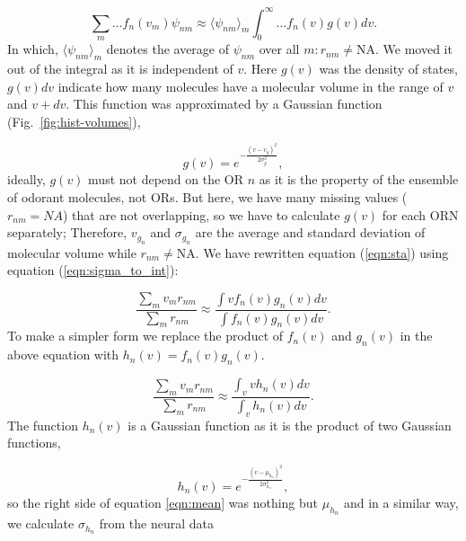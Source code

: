 \documentclass[fleqn,11pt]{wlscirep}
\begin{document}
\begin{equation}
	\sum_{m} \dots f_n(v_m) \psi_{nm} \approx  \langle \psi_{nm} \rangle_m \int_0^\infty \dots f_n(v) g(v)  dv. 
	\label{eqn:sigma_to_int}
\end{equation}
In which, 
$\langle \psi_{nm} \rangle_m$ denotes the average of $\psi_{nm}$ over all $m: r_{nm} \neq \text{NA}$. 
We moved it out of the integral as it is independent of $v$.
Here $g(v)$ was the density of states, $g(v) dv$ indicate how many molecules have a molecular volume in the range of $v$ and $v+dv$.
This function was approximated by a Gaussian function (Fig.~\ref{fig:hist-volumes}), 

\begin{equation}
	g(v) = e^{-\frac{(v- v_{g})^2}{2 \sigma_{g}^2}},
	\label{eqn:hist-volumes}
\end{equation}
ideally, $g(v)$ must not depend on the OR $n$ as it is the property of the ensemble of odorant molecules, not ORs. 
But here, we have many missing values ($r_{nm} = NA$) that are not overlapping, 
so we have to calculate $g(v)$ for each ORN separately; 
Therefore, $v_{g_n}$ and $\sigma_{g_n}$ are the average and standard deviation of molecular volume while $r_{nm} \neq \text{NA}$.
We have rewritten equation (\ref{eqn:sta}) using equation (\ref{eqn:sigma_to_int}):

\begin{equation}
	\frac{\displaystyle \sum_{m} v_m r_{nm}}{\displaystyle \sum_{m} r_{nm}} \approx \frac{\displaystyle \int v f_n(v) g_n(v) dv}{\displaystyle \int f_n(v) g_n(v) dv}.
	\label{eqn:sta_int}
\end{equation}
To make a simpler form we replace the product of $f_n(v)$ and $g_n(v)$ in the above equation with $h_n(v) = f_n(v) g_n(v)$.

\begin{equation}
	\frac{\displaystyle \sum_{m} v_m r_{nm}}{\displaystyle \sum_{m} r_{nm}} \approx \frac{\displaystyle \int_v v h_n(v) dv}{ \displaystyle \int_v  h_n(v) dv }.
	\label{eqn:mean}
\end{equation}
The function $h_n(v)$ is a Gaussian function as it is the product of two Gaussian functions, 

\begin{equation}
h_n(v) = e^{-\frac{(v-\mu_{h_n})^2}{2\sigma_{h_n}^2}}, 
\end{equation}
so the right side of equation \ref{eqn:mean} was nothing but $\mu_{h_n}$ and 
in a similar way, we calculate $\sigma_{h_n}$ from the neural data
\end{document}
